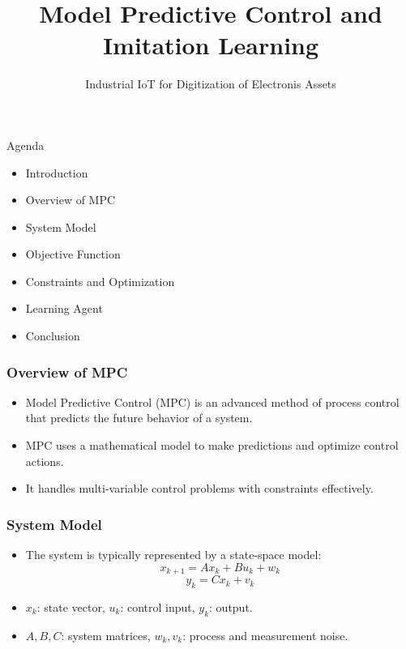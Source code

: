 \documentclass[aspectratio=169,hyperref={pdfpagelabels=false}]{beamer}
\subtitle{\normalsize{Industrial IoT for Digitization of Electronis Assets}}
\title{Model Predictive Control and Imitation Learning}
\begin{document}
\inserttitlepage

\begin{frame}{Agenda}
    \begin{itemize}
        \item Introduction
        \item Overview of MPC
        \item System Model
        \item Objective Function
        \item Constraints and Optimization
        \item Learning Agent
        \item Conclusion
    \end{itemize}
\end{frame}

\begin{frame}
  \frametitle{Overview of MPC}
  \begin{itemize}
      \item Model Predictive Control (MPC) is an advanced method of process control that predicts the future behavior of a system.
      \item MPC uses a mathematical model to make predictions and optimize control actions.
      \item It handles multi-variable control problems with constraints effectively.
  \end{itemize}
  \end{frame}
  
  \begin{frame}
  \frametitle{System Model}
  \begin{itemize}
      \item The system is typically represented by a state-space model:
      \[ x_{k+1} = Ax_k + Bu_k + w_k \]
      \[ y_k = Cx_k + v_k \]
      \item \( x_k \): state vector, \( u_k \): control input, \( y_k \): output.
      \item \( A, B, C \): system matrices, \( w_k, v_k \): process and measurement noise.
  \end{itemize}
  \end{frame}
  
\end{document}
